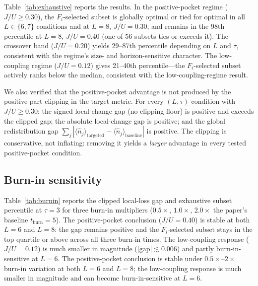 \documentclass[aps,pra,reprint,amsmath,amssymb,longbibliography,floatfix]{revtex4-2}
\newcommand{\Fi}{F_i}
\newcommand{\nop}{\hat{n}}
\begin{document}
Table~\ref{tab:exhaustive} reports the results.
In the positive-pocket regime ($J/U\geq0.30$), the $\Fi$-selected subset
is globally optimal or tied for optimal in all $L\in\{6,7\}$ conditions
and at $L=8$, $J/U=0.30$, and remains in the 98th percentile at
$L=8$, $J/U=0.40$ (one of 56 subsets ties or exceeds it).
The crossover band ($J/U=0.20$) yields 29--87th percentile depending on
$L$ and $\tau$, consistent with the regime's size- and horizon-sensitive
character.
The low-coupling regime ($J/U=0.12$) gives 21--40th percentile---the
$\Fi$-selected subset actively ranks below the median, consistent with
the low-coupling-regime result.

We also verified that the positive-pocket advantage is not produced by
the positive-part clipping in the target metric.
For every $(L,\tau)$ condition with $J/U\geq0.30$: the signed local-change
gap (no clipping floor) is positive and exceeds the clipped gap; the
absolute local-change gap is positive; and the global redistribution gap
$\sum_j|\langle\nop_j\rangle_{\mathrm{targeted}}-\langle\nop_j\rangle_{\mathrm{baseline}}|$
is positive.
The clipping is conservative, not inflating: removing it yields a
\emph{larger} advantage in every tested positive-pocket condition.

\subsection{Burn-in sensitivity}
\label{sec:burnin}

Table~\ref{tab:burnin} reports the clipped local-loss gap and exhaustive
subset percentile at $\tau=3$ for three burn-in multipliers ($0.5\times$,
$1.0\times$, $2.0\times$ the paper's baseline $t_{\mathrm{burn}}=5$).
The positive-pocket conclusion ($J/U=0.40$) is stable at both $L=6$ and
$L=8$: the gap remains positive and the $\Fi$-selected subset stays in
the top quartile or above across all three burn-in times.
The low-coupling response ($J/U=0.12$) is much smaller in magnitude
($|\text{gap}|\lesssim0.006$) and partly burn-in-sensitive at $L=6$.
The positive-pocket conclusion is stable under $0.5\times$--$2\times$
burn-in variation at both $L=6$ and $L=8$; the low-coupling response is
much smaller in magnitude and can become burn-in-sensitive at $L=6$.
\end{document}
